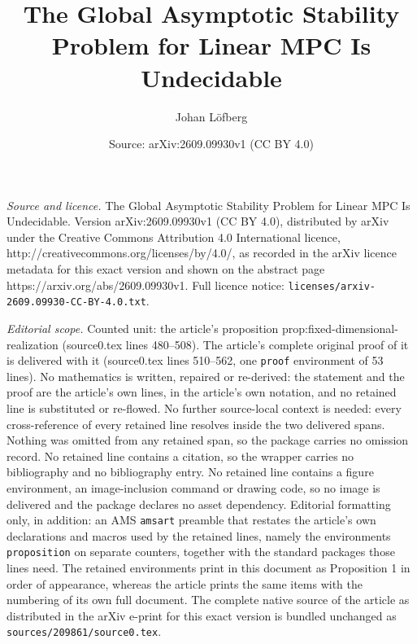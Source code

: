 \documentclass[10pt,a4paper]{amsart}
\title{The Global Asymptotic Stability Problem for Linear MPC Is Undecidable}
\author{Johan L\"ofberg}
\date{Source: arXiv:2609.09930v1 (CC BY 4.0)}
\begin{document}
\maketitle

\noindent\emph{Source and licence.} The Global Asymptotic Stability Problem for Linear MPC Is Undecidable. Version arXiv:2609.09930v1 (CC BY 4.0), distributed by arXiv under the Creative Commons Attribution 4.0 International licence, http://creativecommons.org/licenses/by/4.0/, as recorded in the arXiv licence metadata for this exact version and shown on the abstract page https://arxiv.org/abs/2609.09930v1. Full licence notice: \texttt{licenses/arxiv-2609.09930-CC-BY-4.0.txt}.\par\smallskip

\noindent\textit{Editorial scope.} Counted unit: the article's proposition prop:fixed-dimensional-realization (source0.tex lines 480--508). The article's complete original proof of it is delivered with it (source0.tex lines 510--562, one \texttt{proof} environment of 53 lines). No mathematics is written, repaired or re-derived: the statement and the proof are the article's own lines, in the article's own notation, and no retained line is substituted or re-flowed.  No further source-local context is needed: every cross-reference of every retained line resolves inside the two delivered spans.  Nothing was omitted from any retained span, so the package carries no omission record.  No retained line contains a citation, so the wrapper carries no bibliography and no bibliography entry.  No retained line contains a figure environment, an image-inclusion command or drawing code, so no image is delivered and the package declares no asset dependency.  Editorial formatting only, in addition: an AMS \texttt{amsart} preamble that restates the article's own declarations and macros used by the retained lines, namely the environments \texttt{proposition} on separate counters, together with the standard packages those lines need.  The retained environments print in this document as Proposition 1 in order of appearance, whereas the article prints the same items with the numbering of its own full document.  The complete native source of the article as distributed in the arXiv e-print for this exact version is bundled unchanged as \texttt{sources/209861/source0.tex}.
\end{document}
